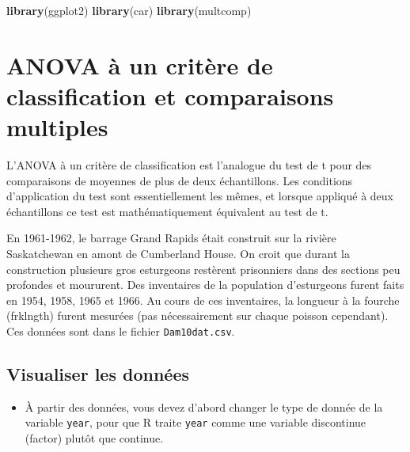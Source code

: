 \documentclass[12pt,]{book}
\newenvironment{Shaded}{\begin{snugshade}}{\end{snugshade}}
\newcommand{\KeywordTok}[1]{\textcolor[rgb]{0.13,0.29,0.53}{\textbf{#1}}}
\newcommand{\NormalTok}[1]{#1}
\newcommand{\OperatorTok}[1]{\textcolor[rgb]{0.81,0.36,0.00}{\textbf{#1}}}
\newcommand{\StringTok}[1]{\textcolor[rgb]{0.31,0.60,0.02}{#1}}
\providecommand{\tightlist}{%
  \setlength{\itemsep}{0pt}\setlength{\parskip}{0pt}}
\begin{document}
\begin{Shaded}
\begin{Highlighting}[]
\KeywordTok{library}\NormalTok{(ggplot2)}
\KeywordTok{library}\NormalTok{(car)}
\KeywordTok{library}\NormalTok{(multcomp)}
\end{Highlighting}
\end{Shaded}

\hypertarget{anova-uxe0-un-crituxe8re-de-classification-et-comparaisons-multiples}{%
\section{ANOVA à un critère de classification et comparaisons multiples}\label{anova-uxe0-un-crituxe8re-de-classification-et-comparaisons-multiples}}

L'ANOVA à un critère de classification est l'analogue du test de t pour des comparaisons de moyennes de plus de deux échantillons. Les conditions d'application du test sont essentiellement les mêmes, et lorsque appliqué à deux échantillons ce test est mathématiquement équivalent au test de t.

En 1961-1962, le barrage Grand Rapids était construit sur la rivière Saskatchewan en amont de Cumberland House. On croit que durant la construction plusieurs gros esturgeons restèrent prisonniers dans des sections peu profondes et moururent. Des inventaires de la population d'esturgeons furent faits en 1954, 1958, 1965 et 1966. Au cours de ces inventaires, la longueur à la fourche (frklngth) furent mesurées (pas nécessairement sur chaque poisson cependant). Ces données sont dans le fichier \texttt{Dam10dat.csv}.

\hypertarget{visualiser-les-donnuxe9es}{%
\subsection{Visualiser les données}\label{visualiser-les-donnuxe9es}}

\begin{itemize}
\tightlist
\item
  À partir des données, vous devez d'abord changer le type de donnée de la variable \texttt{year}, pour que R traite \texttt{year} comme une variable discontinue (factor) plutôt que continue.
\end{itemize}

\begin{Shaded}
\end{Shaded}
\end{document}
